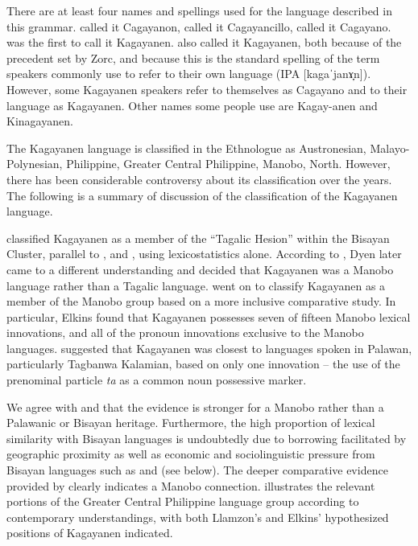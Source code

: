 There are at least four names and spellings used for the language described in this grammar. \citet{dyen1965} called it Cagayanon, \citet{llamzon1974} called it Cagayancillo, \citet{elkins1974} called it Cagayano. \citet{zorc1977} was the first to call it Kagayanen. \citet{harmon1977} also called it Kagayanen, both because of the precedent set by Zorc, and because this is the standard spelling of the term speakers commonly use to refer to their own language (IPA [kagaˈjanɤ̞n]).  However, some Kagayanen speakers refer to themselves as Cagayano and to their language as Kagayanen. Other names some people use are Kagay-anen and Kinagayanen.

The Kagayanen language is classified in the Ethnologue \citep{eberhard2023} as Austronesian, Malayo-Polynesian, Philippine, Greater Central Philippine, Manobo, North. However, there has been considerable controversy about its classification over the years. The following is a summary of  discussion of the classification of the Kagayanen language.

\citet{dyen1965} classified Kagayanen as a member of the “Tagalic Hesion” within the Bisayan Cluster, parallel to , and , using lexicostatistics alone.  According to \citet[639]{elkins1974}, Dyen later came to a different understanding and decided that Kagayanen was a Manobo language rather than a Tagalic language. \citet{elkins1974} went on to classify Kagayanen as a member of the Manobo group based on a more inclusive comparative study. In particular, Elkins found that Kagayanen possesses seven of fifteen Manobo lexical innovations, and all of the pronoun innovations exclusive to the Manobo languages. \citet{llamzon1974} suggested that Kagayanen was closest to languages spoken in Palawan, particularly Tagbanwa Kalamian, based on only one innovation -- the use of the prenominal particle \textit{ta} as a common noun possessive marker. 

We agree with \citet{elkins1974} and \citet{harmon1977} that the evidence is stronger for a Manobo rather than a Palawanic or Bisayan heritage. Furthermore, the high proportion of lexical similarity with Bisayan languages is undoubtedly due to borrowing facilitated by geographic proximity as well as economic and sociolinguistic pressure from Bisayan languages such as  and  (see  below). The deeper comparative evidence provided by \citet{elkins1974} clearly indicates a Manobo connection.  illustrates the relevant portions of the Greater Central Philippine language group \citep{blust1991} according to contemporary understandings, with both Llamzon's and Elkins' hypothesized positions of Kagayanen indicated.

